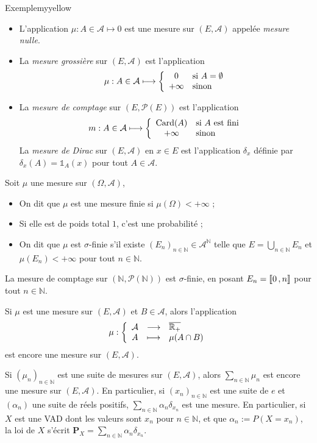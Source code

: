     \begin{omed}{Exemple}{myyellow}
        \begin{itemize}
            \item L’application $\mu : A \in \mathcal{A} \mapsto 0$ est une mesure sur $(E, \mathcal{A})$ appelée \textit{mesure nulle}.
            \item La \textit{mesure grossière} sur $(E, \mathcal{A})$ est l’application 
            \[ \mu : A \in \mathcal{A} \longmapsto \sisinon{0}{A = \emptyset}{+\infty} \]   
            \item La \textit{mesure de comptage} sur $(E, \mathcal{P}(E))$ est l’application 
            \[ m : A \in \mathcal{A} \longmapsto \sisinon{\card(A)}{A \text{ est fini}}{+\infty} \]    
            La \textit{mesure de Dirac} sur $(E,\mathcal{A})$ en $x \in E$ est l’application $\delta_x$ définie par $\delta_x(A) = \mathbb{1}_A(x)$ pour tout $A \in \mathcal{A}$.
        \end{itemize}
    \end{omed}

    \begin{defi}{}{}
        Soit $\mu$ une mesure sur $(\Omega, \mathcal{A})$, 
        \begin{itemize}
            \item On dit que $\mu$ est une mesure finie si $\mu(\Omega) < +\infty$ ;
            \item Si elle est de poids total $1$, c’est une probabilité ;
            \item On dit que $\mu$ est $\sigma$-finie s’il existe $(E_n)_{n \in \mathbb{N}} \in \mathcal{A}^{\mathbb{N}}$ telle que $E = \bigcup_{n \in \mathbb{N}} E_n$ et $\mu(E_n) < +\infty$ pour tout $n \in \mathbb{N}$.
        \end{itemize}
    \end{defi}

    La mesure de comptage sur $(\mathbb{N}, \mathcal{P}(\mathbb{N}))$ est $\sigma$-finie, en posant $E_n = \left\llbracket 0 \, , n \right\rrbracket$ pour tout $n \in \mathbb{N}$.

    Si $\mu$ est une mesure sur $(E, \mathcal{A})$ et $B \in \mathcal{A}$, alors l’application 
    \[ \fonction{\mu}{\mathcal{A}}{\barr{\mathbb{R}_+}}{A}{\mu(A \cap B)} \]    
    est encore une mesure sur $(E, \mathcal{A})$. 

    Si $(\mu_n)_{n \in \mathbb{N}}$ est une suite de mesures sur $(E,\mathcal{A})$, alors $\sum_{n \in \mathbb{N}} \mu_n$ est encore une mesure sur $(E,\mathcal{A})$. En particulier, si $(x_n)_{n \in \mathbb{N}}$ est une suite de $e$ et $(\alpha_n)$ une suite de réels positifs, $\sum_{n \in \mathbb{N}} \alpha_n \delta_{x_n}$ est une mesure. En particulier, si $X$ est une VAD dont les valeurs sont $x_n$ pour $n \in \mathbb{N}$, et que $\alpha_n := P(X = x_n)$, la loi de $X$ s’écrit $\mathbf{P}_X = \sum_{n \in \mathbb{N}} \alpha_n \delta_{x_n}$.

